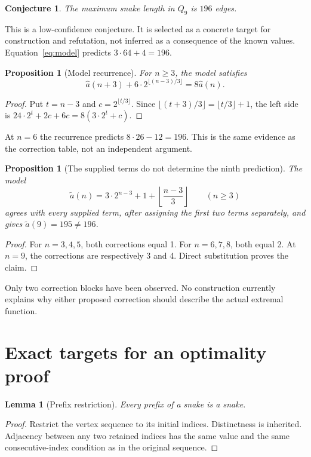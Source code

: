 \documentclass[11pt,a4paper]{article}
\newtheorem{proposition}[theorem]{Proposition}
\newtheorem{lemma}[theorem]{Lemma}
\newtheorem{conjecture}[theorem]{Conjecture}
\theoremstyle{definition}
\theoremstyle{remark}
\newcommand{\Q}{Q}
\begin{document}
\begin{conjecture}\label{conj:196}
The maximum snake length in $\Q_9$ is $196$ edges.
\end{conjecture}
This is a low-confidence conjecture. It is selected as a concrete target for construction and refutation, not inferred as a consequence of the known values. Equation~\eqref{eq:model} predicts $3\cdot64+4=196$.

\begin{proposition}[Model recurrence]
For $n\ge3$, the model satisfies
\[
\widehat a(n+3)+6\cdot2^{\lfloor(n-3)/3\rfloor}=8\widehat a(n).
\]
\end{proposition}
\begin{proof}
Put $t=n-3$ and $c=2^{\lfloor t/3\rfloor}$. Since $\lfloor(t+3)/3\rfloor=\lfloor t/3\rfloor+1$, the left side is
$24\cdot2^t+2c+6c=8(3\cdot2^t+c)$.
\end{proof}
At $n=6$ the recurrence predicts $8\cdot26-12=196$. This is the same evidence as the correction table, not an independent argument.

\begin{proposition}[The supplied terms do not determine the ninth prediction]
The model
\[
\widetilde a(n)=3\cdot2^{n-3}+1+\left\lfloor\frac{n-3}{3}\right\rfloor
\qquad(n\ge3)
\]
agrees with every supplied term, after assigning the first two terms separately, and gives $\widetilde a(9)=195\ne196$.
\end{proposition}
\begin{proof}
For $n=3,4,5$, both corrections equal 1. For $n=6,7,8$, both equal 2. At $n=9$, the corrections are respectively 3 and 4. Direct substitution proves the claim.
\end{proof}
Only two correction blocks have been observed. No construction currently explains why either proposed correction should describe the actual extremal function.

\section{Exact targets for an optimality proof}
\begin{lemma}[Prefix restriction]\label{lem:prefix}
Every prefix of a snake is a snake.
\end{lemma}
\begin{proof}
Restrict the vertex sequence to its initial indices. Distinctness is inherited. Adjacency between any two retained indices has the same value and the same consecutive-index condition as in the original sequence.
\end{proof}
\end{document}
